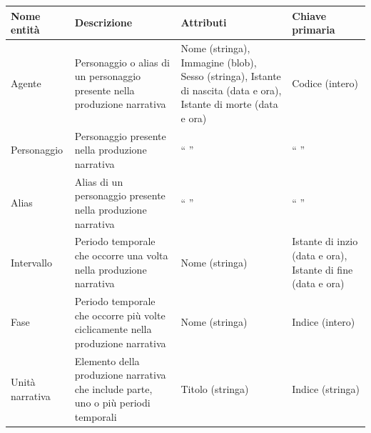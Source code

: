 \documentclass{article}
\begin{document}
\begin{center}\begin{tabular}{|p{}|p{}|p{}|p{}|}
		\hline
		\textbf{Nome entità} & \textbf{Descrizione}                                                               & \textbf{Attributi}                                                                                               & \textbf{Chiave primaria}                                    \\
		\hline
		Agente               & Personaggio o alias di un personaggio presente nella produzione narrativa          & Nome (stringa), Immagine (blob), Sesso (stringa), Istante di nascita (data e ora), Istante di morte (data e ora) & Codice (intero)                                             \\
		\hline
		Personaggio          & Personaggio presente nella produzione narrativa                                    & `` ''                                                                                                            & `` ''                                                       \\
		\hline
		Alias                & Alias di un personaggio presente nella produzione narrativa                        & `` ''                                                                                                            & `` ''                                                       \\
		\hline
		Intervallo           & Periodo temporale che occorre una volta nella produzione narrativa                 & Nome (stringa)                                                                                                   & Istante di inzio (data e ora), Istante di fine (data e ora) \\
		\hline
		Fase                 & Periodo temporale che occorre più volte ciclicamente nella produzione narrativa    & Nome (stringa)                                                                                                   & Indice (intero)                                             \\
		\hline
		Unità narrativa      & Elemento della produzione narrativa che include parte, uno o più periodi temporali & Titolo (stringa)                                                                                                 & Indice (stringa)                                            \\

\end{tabular}
\end{center}
\end{document}
